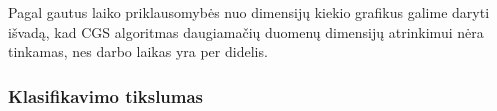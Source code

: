 Pagal gautus laiko priklausomybės nuo dimensijų kiekio grafikus galime daryti išvadą, kad CGS algoritmas daugiamačių duomenų dimensijų atrinkimui nėra tinkamas, nes darbo laikas yra per didelis.

\subsubsection{Klasifikavimo tikslumas}